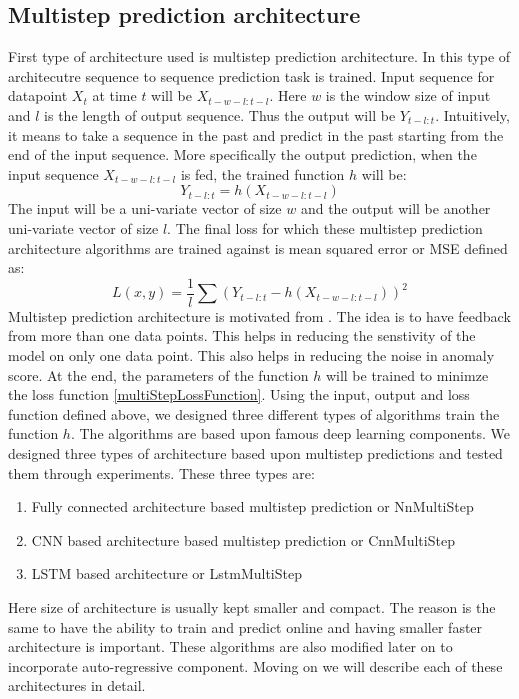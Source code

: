 \documentclass[12pt]{article}
\begin{document}
\subsection{Multistep prediction architecture}
First type of architecture used is multistep prediction architecture. In this type of architecutre sequence to sequence prediction task is trained. Input sequence for datapoint $X_t$ at time $t$ will be $X_{t-w-l:t-l}$. Here $w$ is the window size of input and $l$ is the length of output sequence. Thus the output will be $Y_{t-l:t}$. Intuitively, it means to take a sequence in the past and predict in the past starting from the end of the input sequence.
More specifically the output prediction, when the input sequence $X_{t-w-l:t-l}$ is fed, the trained function $h$ will be:
\begin{equation}
Y_{t-l:t} = h(X_{t-w-l:t-l})
\end{equation}
The input will be a uni-variate vector of size $w$ and the output will be another uni-variate vector of size $l$. The final loss for which these multistep prediction architecture algorithms are trained against is mean squared error or MSE defined as:
\begin{equation}
L(x,y) = \frac{1}{l}\sum(Y_{t-l:t}-h(X_{t-w-l:t-l}))^2
\label{multiStepLossFunction}
\end{equation}
Multistep prediction architecture is motivated from \cite{stackedLstmSecond}. The idea is to have feedback from more than one data points. This helps in reducing the senstivity of the model on only one data point. This also helps in reducing the noise in anomaly score. 
At the end, the parameters of the function $h$ will be trained to minimze the loss function \ref{multiStepLossFunction}. Using the input, output and loss function defined above, we designed three different types of algorithms train the function $h$. The algorithms are based upon famous deep learning components. We designed three types of architecture based upon multistep predictions and tested them through experiments. These three types are:
\begin{enumerate}
	\item Fully connected architecture based multistep prediction or NnMultiStep
	\item CNN based architecture based multistep prediction or CnnMultiStep
	\item LSTM based architecture or LstmMultiStep
\end{enumerate}
Here size of architecture is usually kept smaller and compact. The reason is the same to have the ability to train and predict online and having smaller faster architecture is important. These algorithms are also modified later on to incorporate auto-regressive component. Moving on we will describe each of these architectures in detail.
\end{document}
